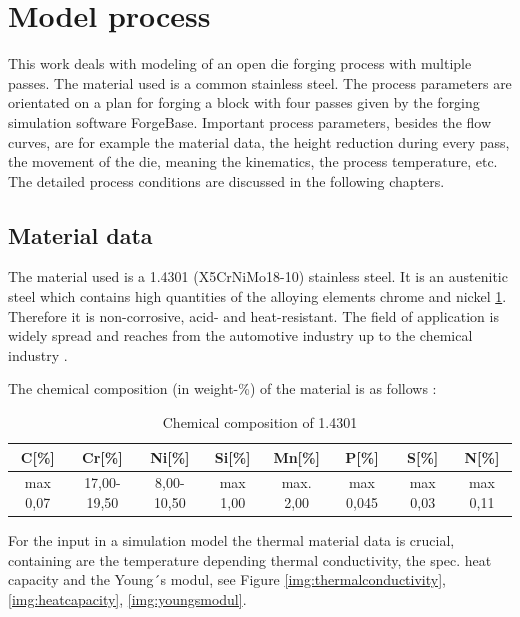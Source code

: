 \section{Model process}
This work deals with modeling of an open die forging process with multiple passes. The material used is a common stainless steel. The process parameters are orientated on a plan for forging a block with four passes given by the forging simulation software ForgeBase. Important process parameters, besides the flow curves, are for example the material data, the height reduction during every pass, the movement of the die, meaning the kinematics, the process temperature, etc. The detailed process conditions are discussed in the following chapters.\par

\subsection{Material data}
The material used is a 1.4301 (X5CrNiMo18-10) stainless steel. It is an austenitic steel which contains high quantities of the alloying elements chrome and nickel \ref{table:chemicalcomposition}. Therefore it is non-corrosive, acid- and heat-resistant. The field of application is widely spread and reaches from the automotive industry up to the chemical industry \cite{1.4301}.\par

The chemical composition (in weight-\%) of the material is as follows \cite{metallograf.de}:
\begin{table}[!htbp]%
 \footnotesize
 \centering
 \caption{Chemical composition of 1.4301}
 \begin{tabular}{|c|c|c|c|c|c|c|c|}
 \hline
 C[\%]&Cr[\%]&Ni[\%]&Si[\%]&Mn[\%]&P[\%]&S[\%]&N[\%]\\\hline
 max 0,07&17,00-19,50&8,00-10,50&max 1,00&max. 2,00&max 0,045&max 0,03&max 0,11\\\hline
 \end{tabular}
 \label{table:chemicalcomposition}
\end{table}\par

For the input in a simulation model the thermal material data is crucial, containing are the temperature depending thermal conductivity, the spec. heat capacity and the Young´s modul, see Figure \ref{img:thermalconductivity}, \ref{img:heatcapacity}, \ref{img:youngsmodul}. 


